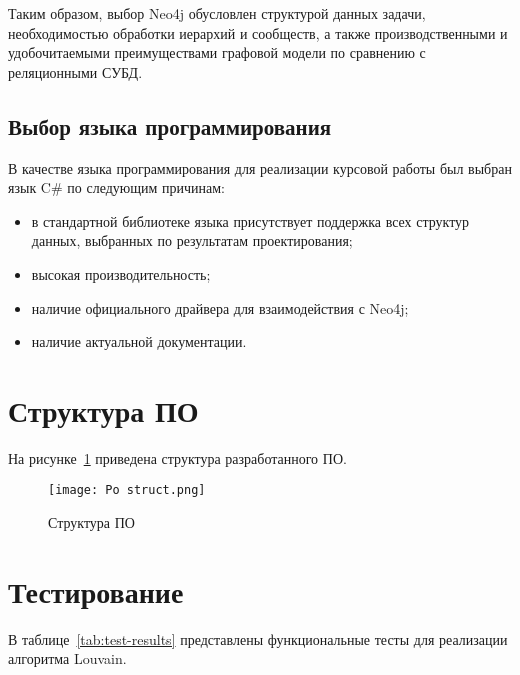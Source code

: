 Таким образом, выбор Neo4j обусловлен структурой данных задачи, необходимостью обработки иерархий и сообществ, а также производственными и удобочитаемыми преимуществами графовой модели по сравнению с реляционными СУБД.

\subsection{Выбор языка программирования}

В качестве языка программирования для реализации курсовой работы был
выбран язык C\# по следующим причинам:

\begin{itemize}
\item в стандартной библиотеке языка присутствует поддержка всех
структур данных, выбранных по результатам проектирования;
\item высокая производительность;
\item наличие официального драйвера для взаимодействия с Neo4j;
\item наличие актуальной документации.
\end{itemize}

\section{Структура ПО}

На рисунке~\ref{fig:Po struct} приведена структура разработанного ПО.

\begin{figure}[H]
	\centering
	\texttt{[image: Po struct.png]}
	\caption{Структура ПО}
	\label{fig:Po struct}
\end{figure}

\section{Тестирование}

В таблице~\ref{tab:test-results} представлены функциональные тесты для реализации алгоритма Louvain.


